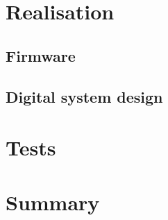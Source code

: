 \documentclass{pzdunek_master_thesis}
\begin{document}
\chapter{Realisation}

\section{Firmware}
\label{chapt:realisation}


\section{Digital system design}
\label{chapt:fpga}


\chapter{Tests}
\label{chapt:Tests}


\chapter{Summary}
\label{chapt:remarks}


\begin{appendices}
\label{chapt:appendix}

\end{appendices}


\end{document}
